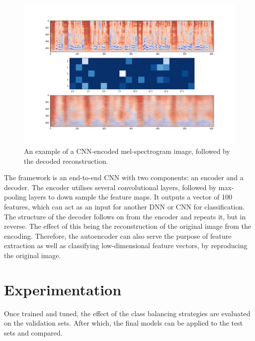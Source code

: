 \documentclass[conference]{IEEEtran}
\begin{document}

\begin{figure}[H]
    \centering
    \includegraphics[scale=0.20]{Figures/Encoding.png}
    \caption{An example of a CNN-encoded mel-spectrogram image, followed by the decoded reconstruction.}
    \label{fig:autoencoder}
\end{figure}

The framework is an end-to-end CNN with two components: an encoder and a decoder. The encoder utilises several convolutional layers, followed by max-pooling layers to down sample the feature maps. It outputs a vector of 100 features, which can act as an input for another DNN or CNN for classification. The structure of the decoder follows on from the encoder and repeats it, but in reverse. The effect of this being the reconstruction of the original image from the encoding. Therefore, the autoencoder can also serve the purpose of feature extraction as well as classifying low-dimensional feature vectors, by reproducing the original image.

\section{Experimentation}
\label{exp}
Once trained and tuned, the effect of the class balancing strategies are evaluated on the validation sets. After which, the final models can be applied to the test sets and compared.
\end{document}

